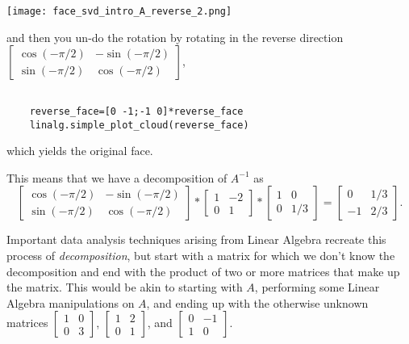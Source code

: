 \documentclass{ximera}
\begin{document}
\begin{center}
  \texttt{[image: face\_svd\_intro\_A\_reverse\_2.png]}
\end{center}

and then you un-do the rotation by rotating in the reverse direction $\begin{bmatrix}\cos(-\pi/2) & -\sin(-\pi/2)\\
  \sin(-\pi/2) & \cos(-\pi/2)\end{bmatrix}$,

  \begin{verbatim}

    reverse_face=[0 -1;-1 0]*reverse_face
    linalg.simple_plot_cloud(reverse_face)

  \end{verbatim}

which yields the original face.

This means that we have a decomposition of $A^{-1}$ as 
$$\begin{bmatrix}\cos(-\pi/2) & -\sin(-\pi/2)\\\sin(-\pi/2) & \cos(-\pi/2)\end{bmatrix}*\begin{bmatrix}1 &-2\\0 &1\end{bmatrix}*\begin{bmatrix}1 &0\\0 &1/3\end{bmatrix}=\begin{bmatrix}0 & 1/3\\-1 & 2/3\end{bmatrix}.$$

Important data analysis techniques arising from Linear Algebra recreate this process of \emph{decomposition}, but start with a matrix for which we don't know the decomposition and end with the product of two or more matrices that make up the matrix. This would be akin to starting with $A$, performing some Linear Algebra manipulations on $A$, and ending up with the otherwise unknown matrices $\begin{bmatrix} 1 & 0 \\ 0 & 3\end{bmatrix}$, $\begin{bmatrix} 1 & 2 \\ 0 & 1\end{bmatrix}$, and $\begin{bmatrix}0 & -1\\ 1 & 0\end{bmatrix}$. 
\end{document}
